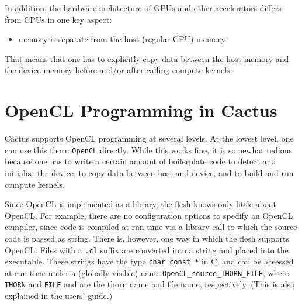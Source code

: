 In addition, the hardware architecture of GPUs and other accelerators
differs from CPUs in one key aspect:
\begin{itemize}
\item memory is separate from the host (regular CPU) memory.
\end{itemize}
That means that one has to explicitly copy data between the host
memory and the device memory before and/or after calling compute
kernels.

\section{OpenCL Programming in Cactus}

Cactus supports OpenCL programming at several levels. At the lowest
level, one can use this thorn \texttt{OpenCL} directly. While this
works fine, it is somewhat tedious because one has to write a certain
amount of boilerplate code to detect and initialise the device, to
copy data between host and device, and to build and run compute
kernels.

Since OpenCL is implemented as a library, the flesh knows only little
about OpenCL\@. For example, there are no configuration options to
spedify an OpenCL compiler, since code is compiled at run time via a
library call to which the source code is passed as string. There is,
however, one way in which the flesh supports OpenCL: Files with a
\texttt{.cl} suffix are converted into a string and placed into the
executable. These strings have the type \texttt{char~const~*} in C,
and can be accessed at run time under a (globally visible) name
\texttt{OpenCL\_source\_THORN\_FILE}, where \texttt{THORN} and
\texttt{FILE} and are the thorn name and file name, respectively.
(This is also explained in the users' guide.)



\begin{thebibliography}{9}

\end{thebibliography}




